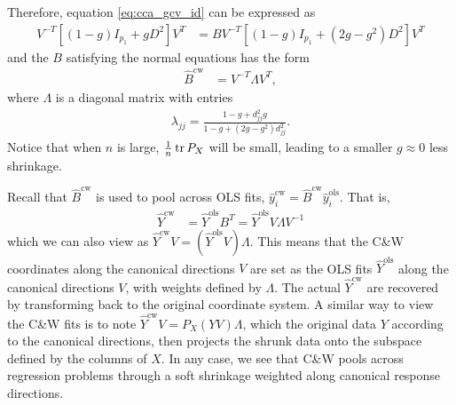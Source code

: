 \documentclass[14pt]{extarticle}
\begin{document}
Therefore, equation \ref{eq:cca_gcv_id} can be expressed as
\begin{align*}
  V^{-T}\left[\left(1 - g\right)I_{p_{1}} + gD^{2}\right]V^{T} &=
  BV^{-T}\left[\left(1 - g\right)I_{p_{1}} + \left(2g -
      g^2\right)D^{2}\right]V^{T}
\end{align*}
and the $B$ satisfying the normal equations has the form
\begin{align*}
\hat{B}^{\text{cw}} &= V^{-T}\Lambda V^{T},
\end{align*}
where $\Lambda$ is a diagonal matrix with entries
\begin{align*}
\lambda_{jj} = \frac{1 - g + d_{jj}^{2}g}{1 - g + \left(2g -
    g^{2}\right)d_{jj}^{2}}.
\end{align*}
Notice that when $n$ is large, $\frac{1}{n}\mathop\mathrm{tr} P_{X}$ will be small, leading to
a smaller $g \approx 0$ less shrinkage.

Recall that $\hat{B}^{\text{cw}}$ is used to pool across OLS fits,
$\hat{y}_{i}^{\text{cw}} = \hat{B}^{\text{cw}}\hat{y}_{i}^{\text{ols}}$. That
is,
\begin{align*}
\hat{Y}^{\text{cw}} &= \hat{Y}^{\text{ols}}B^{T} =
\hat{Y}^{\text{ols}}V\Lambda V^{-1}
\end{align*}
which we can also view as $\hat{Y}^{\text{cw}}V =
\left(\hat{Y}^{\text{ols}}V\right)\Lambda$. This means that the C\&W coordinates
along the canonical directions $V$ are set as the OLS fits
$\hat{Y}^{\text{ols}}$ along the canonical directions $V$, with weights defined
by $\Lambda$. The actual $\hat{Y}^{\text{cw}}$ are recovered by transforming
back to the original coordinate system. A similar way to view the C\&W fits is
to note $\hat{Y}^{\text{cw}}V = P_{X}\left(YV\right)\Lambda$, which the original
data $Y$ according to the canonical directions, then projects the shrunk data
onto the subspace defined by the columns of $X$. In any case, we see that C\&W
pools across regression problems through a soft shrinkage weighted along
canonical response directions.
\end{document}
